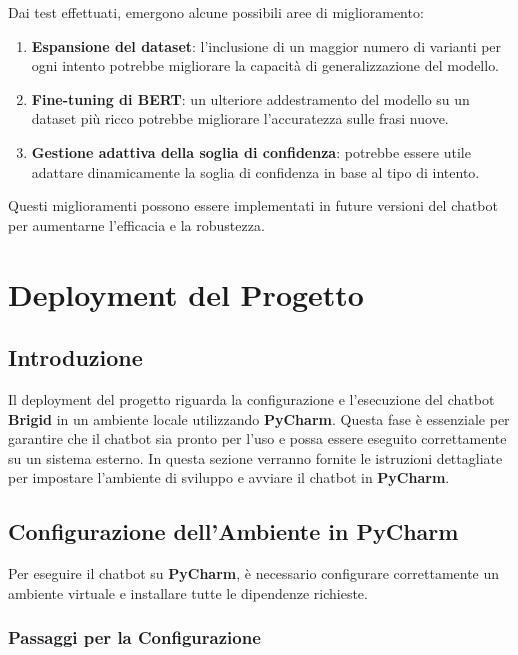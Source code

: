 \documentclass[12pt, letterpaper]{article}
\begin{document}
Dai test effettuati, emergono alcune possibili aree di miglioramento:
\begin{enumerate}
	\item \textbf{Espansione del dataset}: l’inclusione di un maggior numero di varianti per ogni intento potrebbe migliorare la capacità di generalizzazione del modello.
	\item \textbf{Fine-tuning di BERT}: un ulteriore addestramento del modello su un dataset più ricco potrebbe migliorare l’accuratezza sulle frasi nuove.
	\item \textbf{Gestione adattiva della soglia di confidenza}: potrebbe essere utile adattare dinamicamente la soglia di confidenza in base al tipo di intento.
\end{enumerate}
Questi miglioramenti possono essere implementati in future versioni del chatbot per aumentarne l’efficacia e la robustezza.

\section{Deployment del Progetto}

\subsection{Introduzione}
Il deployment del progetto riguarda la configurazione e l'esecuzione del chatbot \textbf{Brigid} in un ambiente locale utilizzando \textbf{PyCharm}. Questa fase è essenziale per garantire che il chatbot sia pronto per l'uso e possa essere eseguito correttamente su un sistema esterno.
In questa sezione verranno fornite le istruzioni dettagliate per impostare l'ambiente di sviluppo e avviare il chatbot in \textbf{PyCharm}.

\subsection{Configurazione dell'Ambiente in PyCharm}

Per eseguire il chatbot su \textbf{PyCharm}, è necessario configurare correttamente un ambiente virtuale e installare tutte le dipendenze richieste.

\subsubsection{Passaggi per la Configurazione}
\end{document}
